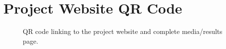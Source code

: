 \documentclass[a4paper,11pt]{article}
\begin{document}
\section{Project Website QR Code}
\label{app:project_qr}

\begin{figure}[h!]
	\centering
	\caption{QR code linking to the project website and complete media/results page.}
\end{figure}
\end{document}
